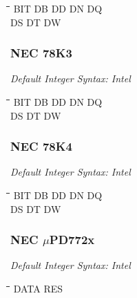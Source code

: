 {\tt\begin{tabbing}
\hspace{3cm}\=\hspace{3cm}\=\hspace{3cm}\=\hspace{3cm}\=\kill
BIT        \> DB         \> DD          \> DN          \> DQ \\
DS         \> DT         \> DW \\
\end{tabbing}}

\subsubsection{NEC 78K3}

{\em Default Integer Syntax: Intel}

{\tt\begin{tabbing}
\hspace{3cm}\=\hspace{3cm}\=\hspace{3cm}\=\hspace{3cm}\=\kill
BIT        \> DB         \> DD          \> DN          \> DQ \\
DS         \> DT         \> DW \\
\end{tabbing}}

\subsubsection{NEC 78K4}

{\em Default Integer Syntax: Intel}

{\tt\begin{tabbing}
\hspace{3cm}\=\hspace{3cm}\=\hspace{3cm}\=\hspace{3cm}\=\kill
BIT        \> DB         \> DD          \> DN          \> DQ \\
DS         \> DT         \> DW \\
\end{tabbing}}

\subsubsection{NEC $\mu$PD772x}

{\em Default Integer Syntax: Intel}

{\tt\begin{tabbing}
\hspace{3cm}\=\hspace{3cm}\=\hspace{3cm}\=\hspace{3cm}\=\kill
DATA       \> RES \\
\end{tabbing}}

